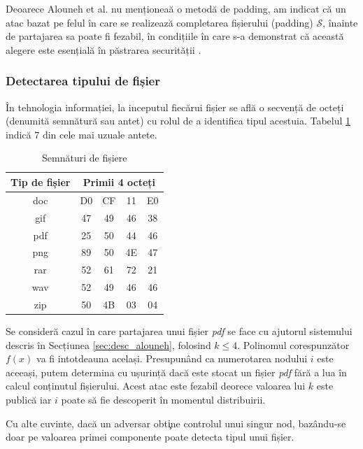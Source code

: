 \documentclass[oneside, 12pt]{book}
\begin{document}
Deoarece Alouneh et al. nu menționeaă o metodă de padding, am indicat că un atac bazat pe felul în care se realizează completarea fișierului (padding) $\mathcal{S}$, înainte de partajarea sa poate fi fezabil, în condițiile în care s-a demonstrat că această alegere este esențială în păstrarea securității \cite{Vaudenay:2002}.

\subsubsection{Detectarea tipului de fișier}
\label{subsec:file_type_detection}

În tehnologia informației, la inceputul fiecărui fișier se află o secvență de octeți (denumită semnătură sau antet) cu rolul de a identifica tipul acestuia. Tabelul {\ref{table:sign}} indică $7$ din cele mai uzuale antete.


\begin{table}[b!]
\bigskip
\begin{center}
\caption{Semnături de fișiere}\label{tb:margins}
\label{table:sign}
\begin{tabular}{ccccc}
Tip de fișier &  \multicolumn{4}{c}{Primii 4 octeți}\\ \hline 
doc &  D0 & CF & 11 & E0\\
gif & 47 & 49 & 46 & 38 \\
pdf & 25 & 50 & 44 & 46 \\
png & 89 & 50 & 4E & 47 \\
rar & 52 & 61 & 72 & 21 \\
wav & 52 & 49 & 46 & 46 \\
zip & 50 & 4B & 03 & 04\\  \hline
\end{tabular}
\end{center}
\bigskip
\end{table}

Se consideră cazul în care partajarea unui fișier \textit{pdf} se face cu ajutorul sistemului descris în {S}ecțiunea \ref{sec:desc_alouneh}, folosind $k \leq 4$. Polinomul corespunzător $f(x)$ va fi intotdeauna același. Presupunând ca numerotarea nodului $i$ este aceeași, putem determina cu ușurință dacă este stocat un fișier \textit{pdf} fără a lua în calcul conținutul fișierului.
Acest atac este fezabil deorece valoarea lui $k$ este publică iar $i$ poate să fie descoperit în momentul distribuirii.

Cu alte cuvinte, dacă un adversar obt\c{i}ne controlul unui singur nod, bazându-se doar pe valoarea primei componente poate detecta tipul unui fișier.
\end{document}
